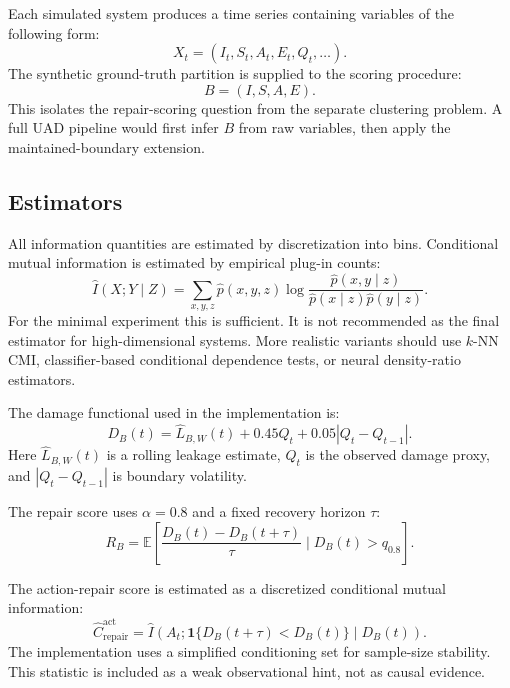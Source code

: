 \documentclass[11pt]{article}
\newcommand{\E}{\mathbb{E}}
\newcommand{\MI}{I}
\newcommand{\given}{\mid}
\begin{document}
Each simulated system produces a time series containing variables of the following form:
\begin{equation}
  X_t =
  (I_t,S_t,A_t,E_t,Q_t,\ldots).
\end{equation}
The synthetic ground-truth partition is supplied to the scoring procedure:
\begin{equation}
  B=(I,S,A,E).
\end{equation}
This isolates the repair-scoring question from the separate clustering problem. A full UAD pipeline would first infer $B$ from raw variables, then apply the maintained-boundary extension.

\subsection{Estimators}

All information quantities are estimated by discretization into bins. Conditional mutual information is estimated by empirical plug-in counts:
\begin{equation}
  \widehat{\MI}(X;Y\given Z)
  =
  \sum_{x,y,z}
  \hat{p}(x,y,z)
  \log
  \frac{
    \hat{p}(x,y\given z)
  }{
    \hat{p}(x\given z)\hat{p}(y\given z)
  }.
\end{equation}
For the minimal experiment this is sufficient. It is not recommended as the final estimator for high-dimensional systems. More realistic variants should use $k$-NN CMI, classifier-based conditional dependence tests, or neural density-ratio estimators.

The damage functional used in the implementation is:
\begin{equation}
  D_B(t)
  =
  \widehat{L}_{B,W}(t)
  +
  0.45 Q_t
  +
  0.05 |Q_t-Q_{t-1}|.
  \label{eq:implemented-damage}
\end{equation}
Here $\widehat{L}_{B,W}(t)$ is a rolling leakage estimate, $Q_t$ is the observed damage proxy, and $|Q_t-Q_{t-1}|$ is boundary volatility.

The repair score uses $\alpha=0.8$ and a fixed recovery horizon $\tau$:
\begin{equation}
  R_B
  =
  \E
  \left[
    \frac{D_B(t)-D_B(t+\tau)}{\tau}
    \given
    D_B(t)>q_{0.8}
  \right].
\end{equation}

The action-repair score is estimated as a discretized conditional mutual information:
\begin{equation}
  \widehat{C}_{\mathrm{repair}}^{\mathrm{act}}
  =
  \widehat{\MI}
  \left(
    A_t;
    \mathbf{1}\{D_B(t+\tau)<D_B(t)\}
    \given
    D_B(t)
  \right).
\end{equation}
The implementation uses a simplified conditioning set for sample-size stability. This statistic is included as a weak observational hint, not as causal evidence.
\end{document}
